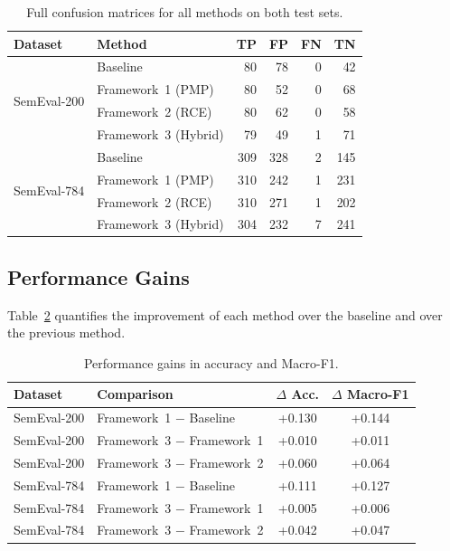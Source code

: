 \documentclass{article} %
\begin{document}
\begin{table}[h]
\centering
\small
\caption{Full confusion matrices for all methods on both test sets.}
\label{tab:confusion-full}
\begin{tabular}{llrrrr}
\toprule
Dataset & Method & TP & FP & FN & TN \\
\midrule
\multirow{4}{*}{SemEval-200}
    & Baseline            & 80 & 78 &  0 & 42 \\
    & Framework~1 (PMP)   & 80 & 52 &  0 & 68 \\
    & Framework~2 (RCE)   & 80 & 62 &  0 & 58 \\
    & Framework~3 (Hybrid)& 79 & 49 &  1 & 71 \\
\midrule
\multirow{4}{*}{SemEval-784}
    & Baseline            & 309 & 328 &  2 & 145 \\
    & Framework~1 (PMP)   & 310 & 242 &  1 & 231 \\
    & Framework~2 (RCE)   & 310 & 271 &  1 & 202 \\
    & Framework~3 (Hybrid)& 304 & 232 &  7 & 241 \\
\bottomrule
\end{tabular}
\end{table}

\subsection{Performance Gains}

Table~\ref{tab:gains} quantifies the improvement of each method over the baseline and over the previous method.

\begin{table}[h]
\centering
\small
\caption{Performance gains in accuracy and Macro-F1.}
\label{tab:gains}
\begin{tabular}{llcc}
\toprule
Dataset & Comparison & $\Delta$ Acc. & $\Delta$ Macro-F1 \\
\midrule
SemEval-200 & Framework~1 $-$ Baseline    & +0.130 & +0.144 \\
SemEval-200 & Framework~3 $-$ Framework~1 & +0.010 & +0.011 \\
SemEval-200 & Framework~3 $-$ Framework~2 & +0.060 & +0.064 \\
\midrule
SemEval-784 & Framework~1 $-$ Baseline    & +0.111 & +0.127 \\
SemEval-784 & Framework~3 $-$ Framework~1 & +0.005 & +0.006 \\
SemEval-784 & Framework~3 $-$ Framework~2 & +0.042 & +0.047 \\
\bottomrule
\end{tabular}
\end{table}
\end{document}

